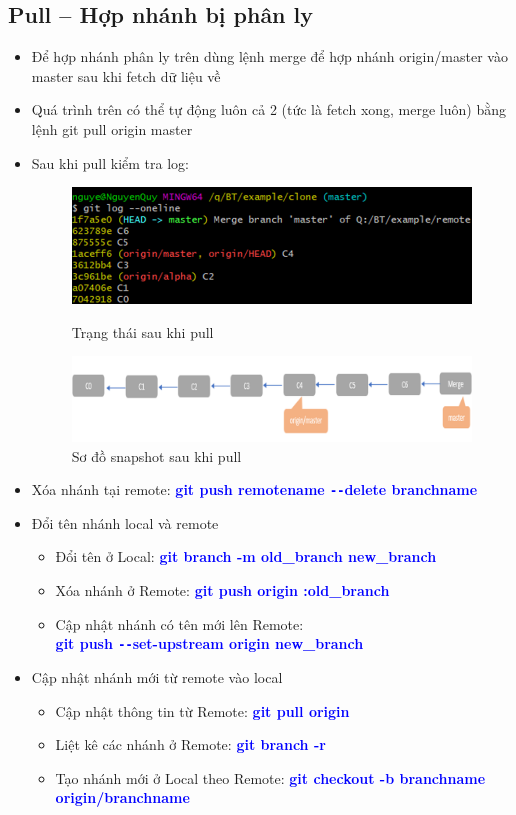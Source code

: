 \documentclass[12pt,a4paper]{report}
\begin{document}
\subsection{Pull – Hợp nhánh bị phân ly}
\begin{itemize}
\item Để hợp nhánh phân ly trên dùng lệnh merge để hợp nhánh origin/master vào master sau khi fetch dữ liệu về
\item Quá trình trên có thể tự động luôn cả 2 (tức là fetch xong, merge luôn) bằng lệnh git pull origin master
\item  Sau khi pull kiểm tra log:
 
\begin{figure}[!ht]
	\centering
 \includegraphics[width=0.8\linewidth]{screenshot076}
 	\label{fig:screenshot076}
\caption{Trạng thái sau khi pull}
\end{figure}

\begin{figure}[!ht]
	\centering
 	\includegraphics[width=0.8\linewidth]{screenshot077}
\caption{Sơ đồ snapshot sau khi pull}
 	\label{fig:screenshot077}
 	\end{figure}

\item Xóa nhánh tại remote: \textcolor{blue}{\bf git push remotename \texttt{-{}-}delete branchname}
 
\item Đổi tên nhánh local và remote
\begin{itemize}
	\item Đổi tên ở Local: \textcolor{blue}{\bf git branch -m old\_branch new\_branch}
  	\item Xóa nhánh ở Remote: \textcolor{blue}{\bf git push origin :old\_branch}
  	\item Cập nhật nhánh có tên mới lên  Remote:\\ \textcolor{blue}{\bf git push \texttt{-{}-}set-upstream origin new\_branch}
\end{itemize}
\item Cập nhật nhánh mới từ remote vào local
 	\begin{itemize}
 	\item Cập nhật thông tin từ Remote: \textcolor{blue}{\bf git pull origin}
	\item Liệt kê các nhánh ở Remote: \textcolor{blue}{\bf git branch -r}
  	\item Tạo nhánh mới ở Local theo Remote: \textcolor{blue}{\bf git checkout -b branchname  origin/branchname}
 \end{itemize}\end{itemize}
\end{document}
